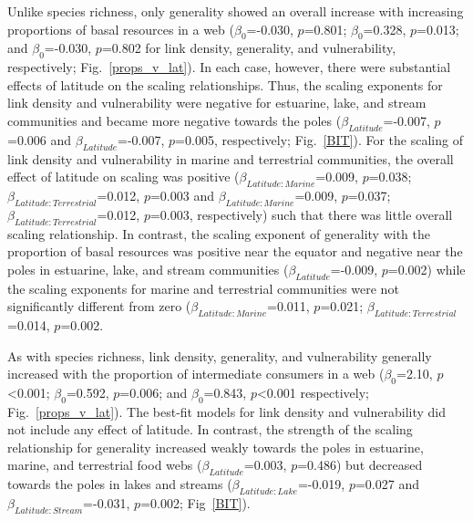 \documentclass[12pt]{article}
\begin{document}
  Unlike species richness, only generality showed an overall increase with increasing
  proportions of basal resources in a web ($\beta_0$=-0.030, $p$=0.801;
  $\beta_0$=0.328, $p$=0.013; and $\beta_0$=-0.030, $p$=0.802 for link
  density, generality, and vulnerability, respectively;
  Fig.~\ref{props_v_lat}). In each case, however, there were substantial
  effects of latitude on the scaling relationships. Thus, the scaling
  exponents for link density and vulnerability were negative for estuarine,
  lake, and stream communities and became more negative towards the poles
  ($\beta_{Latitude}$=-0.007, $p$=0.006 and $\beta_{Latitude}$=-0.007,
  $p$=0.005, respectively; Fig.~\ref{BIT}). For the scaling of link density and
  vulnerability in marine and terrestrial communities, the overall effect of
  latitude on scaling was positive ($\beta_{Latitude:Marine}$=0.009,
  $p$=0.038; $\beta_{Latitude:Terrestrial}$=0.012, $p$=0.003 and
  $\beta_{Latitude:Marine}$=0.009, $p$=0.037;
  $\beta_{Latitude:Terrestrial}$=0.012, $p$=0.003, respectively) such that
  there was little overall scaling relationship. In contrast, the scaling
  exponent of generality with the proportion of basal resources was positive
  near the equator and negative near the poles in estuarine, lake, and stream
  communities ($\beta_{Latitude}$=-0.009, $p$=0.002) while the scaling
  exponents for marine and terrestrial communities were not significantly
  different from zero ($\beta_{Latitude:Marine}$=0.011, $p$=0.021;
  $\beta_{Latitude:Terrestrial}$=0.014, $p$=0.002.


  As with species richness, link density, generality, and vulnerability
  generally increased with the proportion of intermediate consumers in a web
  ($\beta_0$=2.10, $p$\textless0.001; $\beta_0$=0.592, $p$=0.006; and
  $\beta_0$=0.843, $p$\textless0.001 respectively; Fig.~\ref{props_v_lat}). 
  The best-fit models for link density and vulnerability did not include
  any effect of latitude. In contrast, the strength of the scaling relationship
  for generality increased weakly towards the poles in estuarine, marine, and
  terrestrial food webs ($\beta_{Latitude}$=0.003, $p$=0.486) but decreased 
  towards the poles in lakes and streams ($\beta_{Latitude:Lake}$=-0.019, $p$=0.027
  and $\beta_{Latitude:Stream}$=-0.031, $p$=0.002; Fig~\ref{BIT}).
\end{document}
